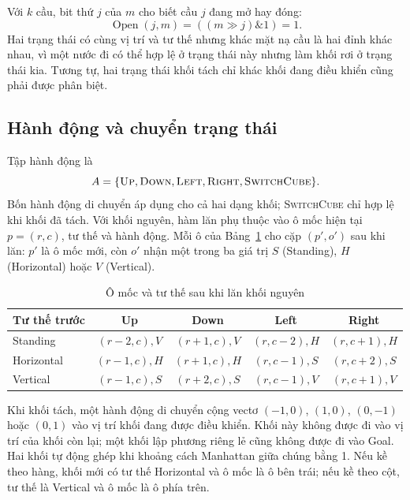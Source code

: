 Với $k$ cầu, bit thứ $j$ của $m$ cho biết cầu $j$ đang mở hay đóng:
\begin{equation}
\operatorname{Open}(j,m)=((m\mathbin{\gg}j)\mathbin{\&}1)=1.
\end{equation}
Hai trạng thái có cùng vị trí và tư thế nhưng khác mặt nạ cầu là hai đỉnh
khác nhau, vì một nước đi có thể hợp lệ ở trạng thái này nhưng làm khối rơi ở
trạng thái kia. Tương tự, hai trạng thái khối tách chỉ khác khối đang điều
khiển cũng phải được phân biệt.

\subsection{Hành động và chuyển trạng thái}

Tập hành động là
\begin{equation}
A=\{\textsc{Up},\textsc{Down},\textsc{Left},\textsc{Right},
\textsc{SwitchCube}\}.
\end{equation}
Bốn hành động di chuyển áp dụng cho cả hai dạng khối; \textsc{SwitchCube} chỉ
hợp lệ khi khối đã tách. Với khối nguyên, hàm lăn phụ thuộc vào ô mốc hiện tại
$p=(r,c)$, tư thế và hành động. Mỗi ô của Bảng~\ref{tab:orientation-transition}
cho cặp $(p',o')$ sau khi lăn: $p'$ là ô mốc mới, còn $o'$ nhận một trong ba
giá trị $S$ (Standing), $H$ (Horizontal) hoặc $V$ (Vertical).

\begin{table}[H]
\centering
\caption{Ô mốc và tư thế sau khi lăn khối nguyên}
\label{tab:orientation-transition}
\normalsize
\setlength{\tabcolsep}{8pt}
\renewcommand{\arraystretch}{1.25}
\begin{tabular}{@{}lcccc@{}}
\toprule
\textbf{Tư thế trước} & \textbf{Up} & \textbf{Down} & \textbf{Left} & \textbf{Right} \\
\midrule
Standing & $(r-2,c),V$ & $(r+1,c),V$ & $(r,c-2),H$ & $(r,c+1),H$ \\
Horizontal & $(r-1,c),H$ & $(r+1,c),H$ & $(r,c-1),S$ & $(r,c+2),S$ \\
Vertical & $(r-1,c),S$ & $(r+2,c),S$ & $(r,c-1),V$ & $(r,c+1),V$ \\
\bottomrule
\end{tabular}
\end{table}

Khi khối tách, một hành động di chuyển cộng vectơ $(-1,0)$, $(1,0)$,
$(0,-1)$ hoặc $(0,1)$ vào vị trí khối đang được điều khiển. Khối này không
được đi vào vị trí của khối còn lại; một khối lập phương riêng lẻ cũng không
được đi vào Goal. Hai khối tự động ghép khi khoảng cách Manhattan giữa chúng
bằng 1. Nếu kề theo hàng, khối mới có tư thế Horizontal và ô mốc là ô bên
trái; nếu kề theo cột, tư thế là Vertical và ô mốc là ô phía trên.

